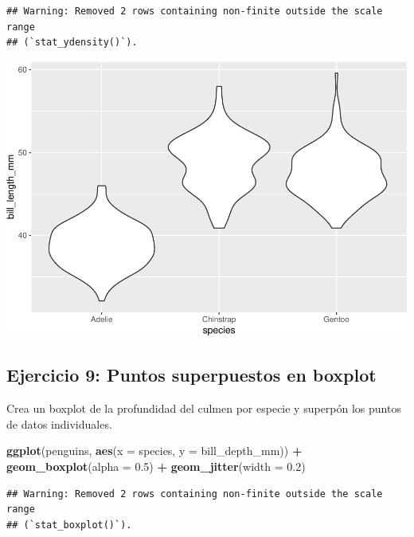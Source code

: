 \documentclass[
]{book}
\newenvironment{Shaded}{\begin{snugshade}}{\end{snugshade}}
\newcommand{\AttributeTok}[1]{\textcolor[rgb]{0.13,0.29,0.53}{#1}}
\newcommand{\FloatTok}[1]{\textcolor[rgb]{0.00,0.00,0.81}{#1}}
\newcommand{\FunctionTok}[1]{\textcolor[rgb]{0.13,0.29,0.53}{\textbf{#1}}}
\newcommand{\NormalTok}[1]{#1}
\newcommand{\SpecialCharTok}[1]{\textcolor[rgb]{0.81,0.36,0.00}{\textbf{#1}}}
\begin{document}
\begin{verbatim}
## Warning: Removed 2 rows containing non-finite outside the scale range
## (`stat_ydensity()`).
\end{verbatim}

\includegraphics{bookdown-demo_files/figure-latex/unnamed-chunk-184-1.pdf}

\hypertarget{ejercicio-9-puntos-superpuestos-en-boxplot}{%
\subsection{Ejercicio 9: Puntos superpuestos en boxplot}\label{ejercicio-9-puntos-superpuestos-en-boxplot}}

Crea un boxplot de la profundidad del culmen por especie y superpón los puntos de datos individuales.

\begin{Shaded}
\begin{Highlighting}[]
\FunctionTok{ggplot}\NormalTok{(penguins, }\FunctionTok{aes}\NormalTok{(}\AttributeTok{x =}\NormalTok{ species, }\AttributeTok{y =}\NormalTok{ bill\_depth\_mm)) }\SpecialCharTok{+}
  \FunctionTok{geom\_boxplot}\NormalTok{(}\AttributeTok{alpha =} \FloatTok{0.5}\NormalTok{) }\SpecialCharTok{+}
  \FunctionTok{geom\_jitter}\NormalTok{(}\AttributeTok{width =} \FloatTok{0.2}\NormalTok{)}
\end{Highlighting}
\end{Shaded}

\begin{verbatim}
## Warning: Removed 2 rows containing non-finite outside the scale range
## (`stat_boxplot()`).
\end{verbatim}
\end{document}
